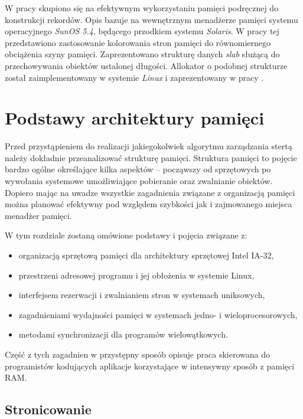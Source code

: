 \documentclass[12pt,a4paper,titlepage,twoside]{mwart}
\begin{document}
W pracy \cite{bonwick94slab} skupiono się na efektywnym wykorzystaniu pamięci
podręcznej do konstrukcji rekordów. Opis bazuje na wewnętrznym menadżerze
pamięci systemu operacyjnego \textit{SunOS 5.4}, będącego przodkiem systemu
\textit{Solaris}. W pracy tej przedstawiono zastosowanie kolorowania stron
pamięci do równomiernego obciążenia szyny pamięci. Zaprezentowano strukturę
danych \textit{slab} służącą do przechowywania obiektów ustalonej długości.
Allokator o podobnej strukturze został zaimplementowany w systemie
\textit{Linux} i zaprezentowany w pracy \cite{fitzgibbons00linux}.

\newpage


\section{Podstawy architektury pamięci}
\hypertarget{Architektura}{}

Przed przystąpieniem do realizacji jakiegokolwiek algorytmu zarządzania stertą
należy dokładnie przeanalizować strukturę pamięci. Struktura pamięci to pojęcie
bardzo ogólne określające kilka aspektów -- począwszy od sprzętowych po
wywołania systemowe umożliwiające pobieranie oraz zwalnianie obiektów. Dopiero
mając na uwadze wszystkie zagadnienia związane z organizacją pamięci można
planować efektywny pod względem szybkości jak i zajmowanego miejsca menadżer
pamięci.

W tym rozdziale zostaną omówione podstawy i pojęcia związane z:
\begin{itemize}
\item organizacją sprzętową pamięci dla architektury sprzętowej Intel IA-32,
\item przestrzeni adresowej programu i jej obłożenia w systemie Linux,
\item interfejsem rezerwacji i zwalnianiem stron w systemach uniksowych,
\item zagadnieniami wydajności pamięci w systemach jedno- i wieloprocesorowych,
\item metodami synchronizacji dla programów wielowątkowych.
\end{itemize}

Część z tych zagadnien w przystępny sposób opisuje praca \cite{pas02memory}
skierowana do programistów kodujących aplikacje korzystające w intensywny
sposób z pamięci RAM.

\subsection{Stronicowanie}
\end{document}
